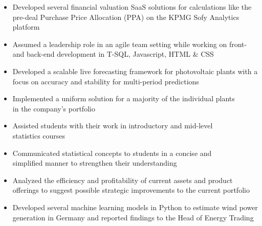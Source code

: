 \documentclass[9pt,a4paper,ragged2e]{altacv}
\begin{document}
    \medskip


    \begin{itemize}
        \item Developed several financial valuation SaaS solutions for calculations like the pre-deal Purchase Price Allocation (PPA) on the KPMG Sofy Analytics platform
        \item Assumed a leadership role in an agile team setting while working on front- and back-end development in T-SQL, Javascript, HTML \& CSS
    \end{itemize}

    \divider

    \begin{itemize}
        \item Developed a scalable live forecasting framework for photovoltaic plants with a focus on accuracy and stability for multi-period predictions
        \item Implemented a uniform solution for a majority of the individual plants \\ in the company's portfolio
    \end{itemize}

    \divider

    \begin{itemize}
        \item Assisted students with their work in introductory and mid-level \\ statistics courses
        \item Communicated statistical concepts to students in a concise and \\ simplified manner to strengthen their understanding
    \end{itemize}

    \divider

    \begin{itemize}
        \item Analyzed the efficiency and profitability of current assets and product offerings to suggest possible strategic improvements to the current portfolio
        \item Developed several machine learning models in Python to estimate wind power generation in Germany and reported findings to the Head of Energy Trading
    \end{itemize}
\end{document}
